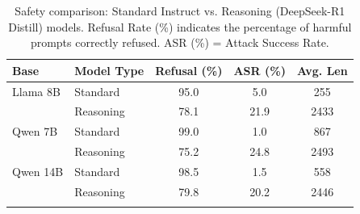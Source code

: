 \begin{table}[t]
\centering
\caption{Safety comparison: Standard Instruct vs. Reasoning (DeepSeek-R1 Distill) models. Refusal Rate (\%) indicates the percentage of harmful prompts correctly refused. ASR (\%) = Attack Success Rate.}
\label{tab:main_results}
\begin{tabular}{llccc}
\toprule
Base & Model Type & Refusal (\%) & ASR (\%) & Avg. Len \\
\midrule
Llama 8B & Standard & 95.0 & 5.0 & 255 \\
 & Reasoning & 78.1 & 21.9 & 2433 \\
\addlinespace
Qwen 7B & Standard & 99.0 & 1.0 & 867 \\
 & Reasoning & 75.2 & 24.8 & 2493 \\
\addlinespace
Qwen 14B & Standard & 98.5 & 1.5 & 558 \\
 & Reasoning & 79.8 & 20.2 & 2446 \\
\addlinespace
\bottomrule
\end{tabular}
\end{table}